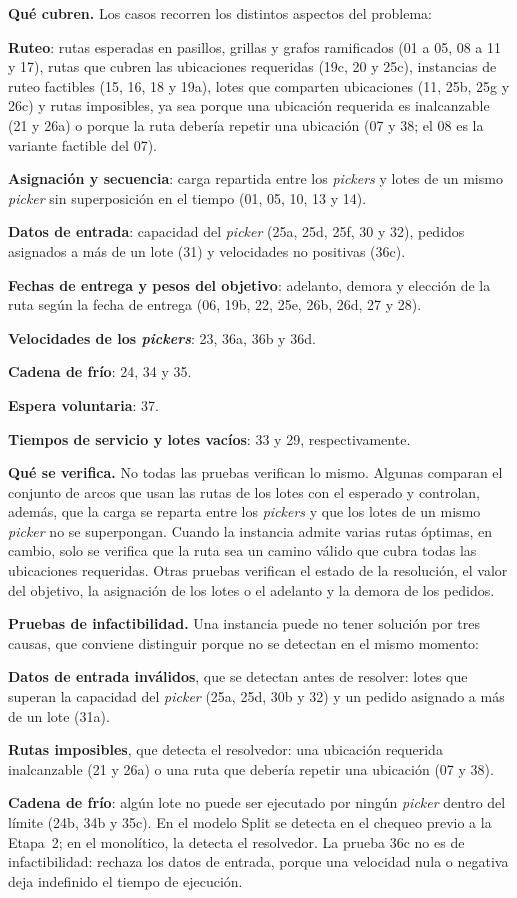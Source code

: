 {\bf Qué cubren.} Los casos recorren los distintos aspectos del problema:
\startitemize
	\item {\bf Ruteo}: rutas esperadas en pasillos, grillas y grafos
	ramificados (01 a 05, 08 a 11 y 17), rutas que cubren las ubicaciones
	requeridas (19c, 20 y 25c), instancias de ruteo factibles (15, 16, 18 y
	19a), lotes que comparten ubicaciones
	(11, 25b, 25g y 26c) y rutas imposibles, ya sea porque una ubicación
	requerida es inalcanzable (21 y 26a) o porque la ruta debería repetir una
	ubicación (07 y 38; el 08 es la variante factible del 07).
	\item {\bf Asignación y secuencia}: carga repartida entre los
	{\em pickers} y lotes de un mismo {\em picker} sin superposición en el
	tiempo (01, 05, 10, 13 y 14).
	\item {\bf Datos de entrada}: capacidad del {\em picker} (25a, 25d, 25f, 30 y 32),
	pedidos asignados a más de un lote (31) y velocidades no positivas (36c).
	\item {\bf Fechas de entrega y pesos del objetivo}: adelanto, demora y
	elección de la ruta según la fecha de entrega (06, 19b, 22, 25e, 26b, 26d,
	27 y 28).
	\item {\bf Velocidades de los {\em pickers}}: 23, 36a, 36b y 36d.
	\item {\bf Cadena de frío}: 24, 34 y 35.
	\item {\bf Espera voluntaria}: 37.
	\item {\bf Tiempos de servicio y lotes vacíos}: 33 y 29, respectivamente.
\stopitemize

{\bf Qué se verifica.} No todas las pruebas verifican lo mismo. Algunas
comparan el conjunto de arcos que usan las rutas de los lotes con el
esperado y controlan, además, que
la carga se reparta entre los {\em pickers} y que los lotes de un mismo
{\em picker} no se superpongan. Cuando la instancia admite varias rutas
óptimas, en cambio, solo se verifica que la ruta sea un camino válido que
cubra todas las ubicaciones requeridas. Otras pruebas verifican el estado de
la resolución, el valor del objetivo, la asignación de los lotes o el
adelanto y la demora de los pedidos.

{\bf Pruebas de infactibilidad.} Una instancia puede no tener solución por
tres causas, que conviene distinguir porque no se detectan en el mismo
momento:
\startitemize
	\item {\bf Datos de entrada inválidos}, que se detectan antes de resolver:
	lotes que superan la capacidad del {\em picker} (25a, 25d, 30b y 32) y un pedido
	asignado a más de un lote (31a).
	\item {\bf Rutas imposibles}, que detecta el resolvedor: una ubicación
	requerida inalcanzable (21 y 26a) o una ruta que debería repetir una
	ubicación (07 y 38).
	\item {\bf Cadena de frío}: algún lote no puede ser ejecutado por ningún
	{\em picker} dentro del límite (24b, 34b y 35c). En el modelo Split se
	detecta en el chequeo previo a la Etapa~2; en el monolítico, la detecta el
	resolvedor.
\stopitemize
La prueba 36c no es de infactibilidad: rechaza los datos de entrada, porque
una velocidad nula o negativa deja indefinido el tiempo de ejecución.


